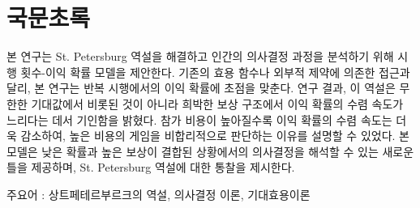 \chapter*{국문초록}

\begin{center}
  \begin{minipage}{0.8\textwidth}
    본 연구는 St. Petersburg 역설을 해결하고 인간의 의사결정 과정을 분석하기 위해 시행 횟수-이익 확률 모델을 제안한다. 기존의 효용 함수나 외부적 제약에 의존한 접근과 달리, 본 연구는 반복 시행에서의 이익 확률에 초점을 맞춘다. 연구 결과, 이 역설은 무한한 기대값에서 비롯된 것이 아니라 희박한 보상 구조에서 이익 확률의 수렴 속도가 느리다는 데서 기인함을 밝혔다. 참가 비용이 높아질수록 이익 확률의 수렴 속도는 더욱 감소하여, 높은 비용의 게임을 비합리적으로 판단하는 이유를 설명할 수 있었다. 본 모델은 낮은 확률과 높은 보상이 결합된 상황에서의 의사결정을 해석할 수 있는 새로운 틀을 제공하며, St. Petersburg 역설에 대한 통찰을 제시한다.
  \end{minipage}
\end{center}

\vspace{1em}
주요어 : 상트페테르부르크의 역설, 의사결정 이론, 기대효용이론
